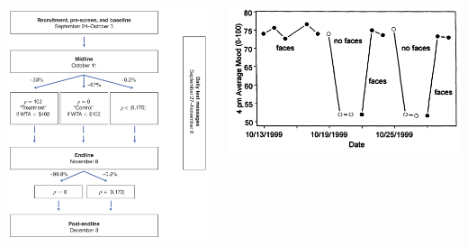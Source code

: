 \documentclass[aspectratio=169]{beamer}
\begin{document}
\begin{frame}

\begin{columns}
\begin{column}{.40\textwidth}
\includegraphics[width=\textwidth]{figures/allcott_welfare_2020_fig1}
\end{column}%

\hfill%

\begin{column}{.60\textwidth}
\includegraphics[width=\textwidth]{figures/roberts_surprising_2001_fig2upper}
\end{column}%
\end{columns}

\end{frame}
\end{document}
